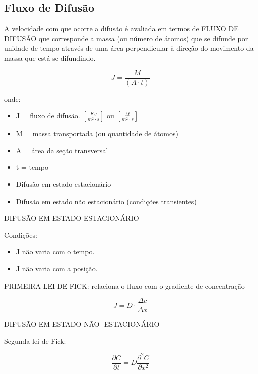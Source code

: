 \subsection{Fluxo de Difusão}

A velocidade com que ocorre a difusão é avaliada em termos de FLUXO DE DIFUSÃO que corresponde a massa (ou número de átomos) que se difunde por unidade de tempo através de uma área perpendicular à direção do movimento da massa que está se difundindo.

\begin{equation}\label{key}
J = \frac{M}{(A \cdot t)}
\end{equation}

onde: 

\begin{itemize}
	\item J = fluxo de difusão. $[\frac{Kg}{m^{2} \cdot s}]$ ou $[\frac{át}{m^{2} \cdot s}]$
	\item M = massa transportada (ou quantidade de átomos)
	\item A = área da seção transversal
	\item t = tempo
\end{itemize}


\begin{itemize}
	\item Difusão em estado estacionário
	\item Difusão em estado não estacionário (condições transientes)
\end{itemize}

DIFUSÃO EM ESTADO ESTACIONÁRIO

Condições:

\begin{itemize}
	\item J não varia com o tempo.
	\item J não varia com a posição.
\end{itemize}

PRIMEIRA LEI DE FICK: relaciona o fluxo com o gradiente de concentração

\begin{equation}\label{key}
J = D \cdot \frac{\Delta c}{\Delta x}
\end{equation}

DIFUSÃO EM ESTADO NÃO- ESTACIONÁRIO

Segunda lei de Fick:

\begin{equation}\label{key}
\frac{\partial C}{\partial t}=D \frac{\partial^{2} C}{\partial x^{2}}
\end{equation}

